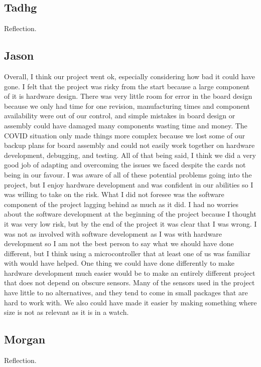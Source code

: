 \subsection{Tadhg}

Reflection.

\subsection{Jason}

Overall, I think our project went ok, especially considering how bad it could
have gone. I felt that the project was risky from the start because a large
component of it is hardware design. There was very little room for error in the
board design because we only had time for one revision, manufacturing times
and component availability were out of our control, and simple mistakes in board 
design or assembly could have damaged many components wasting time and money. 
The COVID situation only made things more complex because we lost some of our 
backup plans for board assembly and could not easily work together on hardware 
development, debugging, and testing. All of that being said, I think we did a 
very good job of adapting and overcoming the issues we faced despite the cards 
not being in our favour. I was aware of all of these potential problems going
into the project, but I enjoy hardware development and was confident in our 
abilities so I was willing to take on the risk. What I did not foresee was the
software component of the project lagging behind as much as it did. I had no
worries about the software development at the beginning of the project 
because I thought it was very low risk, but by the end of the project it was
clear that I was wrong. I was not as involved with software development as I was
with hardware development so I am not the best person to say what we should 
have done different, but I think using a microcontroller that at least one of us
was familiar with would have helped. One thing we could have done differently to 
make hardware development much easier would be to make an entirely different 
project that does not depend on obscure sensors. Many of the sensors used in the 
project have little to no alternatives, and they tend to come in small packages 
that are hard to work with. We also could have made it easier by making 
something where size is not as relevant as it is in a watch.

\subsection{Morgan}

Reflection.

